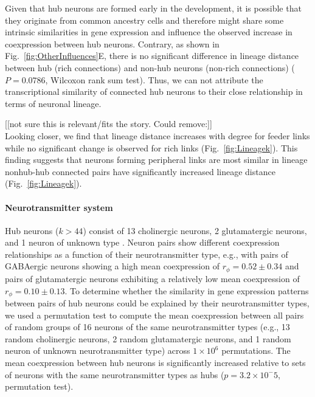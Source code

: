\documentclass[10pt,letterpaper]{article}
\begin{document}
Given that hub neurons are formed early in the development, it is possible that they originate from common ancestry cells and therefore might share some intrinsic similarities in gene expression and influence the observed increase in coexpression between hub neurons.
Contrary, as shown in Fig.~\ref{fig:OtherInfluences}E, there is no significant difference in lineage distance between hub (rich connections) and non-hub neurons (non-rich connections) ($P = 0.0786$, Wilcoxon rank sum test).
Thus, we can not attribute the transcriptional similarity of connected hub neurons to their close relationship in terms of neuronal lineage.

[[not sure this is relevant/fits the story. Could remove:]]\\
Looking closer, we find that lineage distance increases with degree for feeder links while no significant change is observed for rich links (Fig.~\ref{fig:Lineagek}).
This finding suggests that neurons forming peripheral links are most similar in lineage nonhub-hub connected pairs have significantly increased lineage distance (Fig.~\ref{fig:Lineagek}).




\paragraph{Neurotransmitter system}
Hub neurons ($k > 44$) consist of 13 cholinergic neurons, 2 glutamatergic neurons, and 1 neuron of unknown type \cite{Pereira:2015er}.
Neuron pairs show different coexpression relationships as a function of their neurotransmitter type, e.g., with pairs of GABAergic neurons showing a high mean coexpression of $r_\phi = 0.52 \pm 0.34$ and pairs of glutamatergic neurons exhibiting a relatively low mean coexpression of $r_\phi = 0.10 \pm 0.13$.
To determine whether the similarity in gene expression patterns between pairs of hub neurons could be explained by their neurotransmitter types, we used a permutation test to compute the mean coexpression between all pairs of random groups of 16 neurons of the same neurotransmitter types (e.g., 13 random cholinergic neurons, 2 random glutamatergic neurons, and 1 random neuron of unknown neurotransmitter type) across $1\times 10^6$ permutations.
The mean coexpression between hub neurons is significantly increased relative to sets of neurons with the same neurotransmitter types as hubs ($p = 3.2\times 10^-5$, permutation test).
\end{document}
